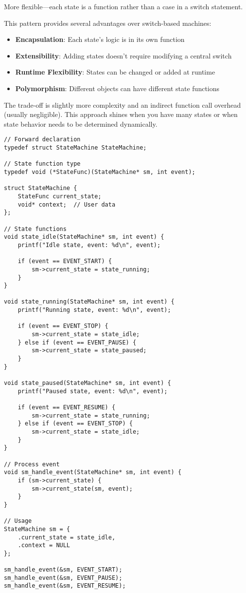 More flexible—each state is a function rather than a case in a switch statement.

This pattern provides several advantages over switch-based machines:

\begin{itemize}
    \item \textbf{Encapsulation}: Each state's logic is in its own function
    \item \textbf{Extensibility}: Adding states doesn't require modifying a central switch
    \item \textbf{Runtime Flexibility}: States can be changed or added at runtime
    \item \textbf{Polymorphism}: Different objects can have different state functions
\end{itemize}

The trade-off is slightly more complexity and an indirect function call overhead (usually negligible). This approach shines when you have many states or when state behavior needs to be determined dynamically.

\begin{lstlisting}
// Forward declaration
typedef struct StateMachine StateMachine;

// State function type
typedef void (*StateFunc)(StateMachine* sm, int event);

struct StateMachine {
    StateFunc current_state;
    void* context;  // User data
};

// State functions
void state_idle(StateMachine* sm, int event) {
    printf("Idle state, event: %d\n", event);

    if (event == EVENT_START) {
        sm->current_state = state_running;
    }
}

void state_running(StateMachine* sm, int event) {
    printf("Running state, event: %d\n", event);

    if (event == EVENT_STOP) {
        sm->current_state = state_idle;
    } else if (event == EVENT_PAUSE) {
        sm->current_state = state_paused;
    }
}

void state_paused(StateMachine* sm, int event) {
    printf("Paused state, event: %d\n", event);

    if (event == EVENT_RESUME) {
        sm->current_state = state_running;
    } else if (event == EVENT_STOP) {
        sm->current_state = state_idle;
    }
}

// Process event
void sm_handle_event(StateMachine* sm, int event) {
    if (sm->current_state) {
        sm->current_state(sm, event);
    }
}

// Usage
StateMachine sm = {
    .current_state = state_idle,
    .context = NULL
};

sm_handle_event(&sm, EVENT_START);
sm_handle_event(&sm, EVENT_PAUSE);
sm_handle_event(&sm, EVENT_RESUME);
\end{lstlisting}

